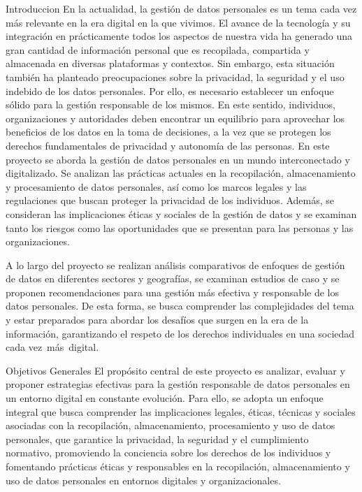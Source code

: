Introduccion
En la actualidad, la gestión de datos personales es un tema cada vez más relevante en la era digital en la que vivimos. El avance de la tecnología y su integración en prácticamente todos los aspectos de nuestra vida ha generado una gran cantidad de información personal que es recopilada, compartida y almacenada en diversas plataformas y contextos.
Sin embargo, esta situación también ha planteado preocupaciones sobre la privacidad, la seguridad y el uso indebido de los datos personales. Por ello, es necesario establecer un enfoque sólido para la gestión responsable de los mismos. En este sentido, individuos, organizaciones y autoridades deben encontrar un equilibrio para aprovechar los beneficios de los datos en la toma de decisiones, a la vez que se protegen los derechos fundamentales de privacidad y autonomía de las personas.
En este proyecto se aborda la gestión de datos personales en un mundo interconectado y digitalizado. Se analizan las prácticas actuales en la recopilación, almacenamiento y procesamiento de datos personales, así como los marcos legales y las regulaciones que buscan proteger la privacidad de los individuos. Además, se consideran las implicaciones éticas y sociales de la gestión de datos y se examinan tanto los riesgos como las oportunidades que se presentan para las personas y las organizaciones.

A lo largo del proyecto se realizan análisis comparativos de enfoques de gestión de datos en diferentes sectores y geografías, se examinan estudios de caso y se proponen recomendaciones para una gestión más efectiva y responsable de los datos personales. De esta forma, se busca comprender las complejidades del tema y estar preparados para abordar los desafíos que surgen en la era de la información, garantizando el respeto de los derechos individuales en una sociedad cada vez más digital.

Objetivos Generales
El propósito central de este proyecto es analizar, evaluar y proponer estrategias efectivas para la gestión responsable de datos personales en un entorno digital en constante evolución. Para ello, se adopta un enfoque integral que busca comprender las implicaciones legales, éticas, técnicas y sociales asociadas con la recopilación, almacenamiento, procesamiento y uso de datos personales, que garantice la privacidad, la seguridad y el cumplimiento normativo, promoviendo la conciencia sobre los derechos de los individuos y fomentando prácticas éticas y responsables en la recopilación, almacenamiento y uso de datos personales en entornos digitales y organizacionales.



